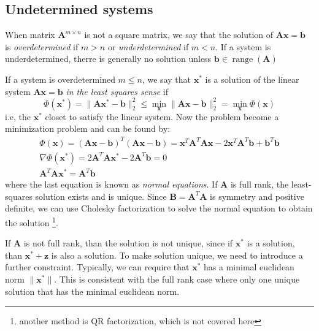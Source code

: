 \documentclass{article}
\DeclareMathOperator{\range}{range}
\begin{document}
\subsection{Undetermined systems}
When matrix $\mathbf{A}^{m\times n}$ is not a square matrix, we say that 
the solution of $\mathbf{A}\mathbf{x} = \mathbf{b}$ is \emph{overdetermined} if $m>n$ 
or \emph{underdetermined} if $m < n$. 
If a system is underdetermined, therre is generally no solution unless 
$\mathbf{b}\in \range(\mathbf{A})$

If a system is overdetermined $m \leq n$, we say that $\mathbf{x}^*$ is a solution
of the linear system $\mathbf{A}\mathbf{x} = \mathbf{b}$ \emph{in the least squares sense}
if 
\begin{equation}
    \Phi(\mathbf{x}^*) = \|\mathbf{A}\mathbf{x}^* - \mathbf{b}\|_2^2 
    \leq \min_{\mathbf{x}} \|\mathbf{A}\mathbf{x} - \mathbf{b}\|_2^2 
    = \min_{\mathbf{x}} \Phi(\mathbf{x})
\end{equation}
i.e, the $\mathbf{x}^*$ closet to satisfy the linear system. Now the problem 
become a minimization problem and can be found by:
\begin{gather*}
    \Phi(\mathbf{x}) 
    = (\mathbf{A}\mathbf{x} - \mathbf{b})^T (\mathbf{A}\mathbf{x} - \mathbf{b})
    = \mathbf{x}^T \mathbf{A}^T \mathbf{A} \mathbf{x} - 2 \mathbf{x}^T \mathbf{A}^T \mathbf{b} 
      +  \mathbf{b}^T \mathbf{b} \\
    \nabla \Phi(\mathbf{x}^*) 
    = 2 \mathbf{A}^T \mathbf{A} \mathbf{x}^* - 2 \mathbf{A}^T \mathbf{b} = 0 \\
    \mathbf{A}^T \mathbf{A} \mathbf{x}^* = \mathbf{A}^T \mathbf{b}
\end{gather*}
where the last equation is known as \emph{normal equations}. If $\mathbf{A}$ is full rank, the 
least-squares solution exists and is unique. 
Since $\mathbf{B} = \mathbf{A}^T \mathbf{A}$ is symmetry and positive definite, we can use 
Cholesky factorization to solve the normal equation to obtain the solution
\footnote{another method is QR factorization, which is not covered here}.

If $\mathbf{A}$ is not full rank, than the solution is not unique, since if $\mathbf{x}^*$ 
is a solution, than $\mathbf{x}^* + \mathbf{z}$ is also a solution. To make solution unique,
we need to introduce a further constraint. Typically, we can require that $\mathbf{x}^*$
has a minimal euclidean norm $\|\mathbf{x}^*\|$.
This is consistent with the full rank case where only one unique solution that has the 
minimal euclidean norm. 
\end{document}
